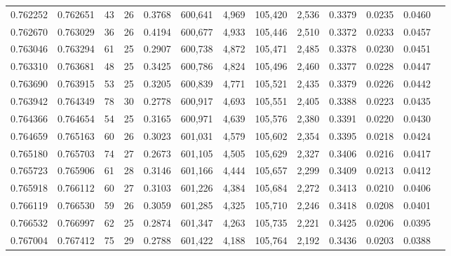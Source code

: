 \begin{tabular}{rrrrrrrrrrrrr}
0.762252 & 0.762651 &  43 &  26 &                                     0.3768 & 600,641 &   4,969 & 105,420 &   2,536 & 0.3379 & 0.0235 & 0.0460 \\
0.762670 & 0.763029 &  36 &  26 &                                     0.4194 & 600,677 &   4,933 & 105,446 &   2,510 & 0.3372 & 0.0233 & 0.0457 \\
0.763046 & 0.763294 &  61 &  25 &                                     0.2907 & 600,738 &   4,872 & 105,471 &   2,485 & 0.3378 & 0.0230 & 0.0451 \\
0.763310 & 0.763681 &  48 &  25 &                                     0.3425 & 600,786 &   4,824 & 105,496 &   2,460 & 0.3377 & 0.0228 & 0.0447 \\
0.763690 & 0.763915 &  53 &  25 &                                     0.3205 & 600,839 &   4,771 & 105,521 &   2,435 & 0.3379 & 0.0226 & 0.0442 \\
0.763942 & 0.764349 &  78 &  30 &                                     0.2778 & 600,917 &   4,693 & 105,551 &   2,405 & 0.3388 & 0.0223 & 0.0435 \\
0.764366 & 0.764654 &  54 &  25 &                                     0.3165 & 600,971 &   4,639 & 105,576 &   2,380 & 0.3391 & 0.0220 & 0.0430 \\
0.764659 & 0.765163 &  60 &  26 &                                     0.3023 & 601,031 &   4,579 & 105,602 &   2,354 & 0.3395 & 0.0218 & 0.0424 \\
0.765180 & 0.765703 &  74 &  27 &                                     0.2673 & 601,105 &   4,505 & 105,629 &   2,327 & 0.3406 & 0.0216 & 0.0417 \\
0.765723 & 0.765906 &  61 &  28 &                                     0.3146 & 601,166 &   4,444 & 105,657 &   2,299 & 0.3409 & 0.0213 & 0.0412 \\
0.765918 & 0.766112 &  60 &  27 &                                     0.3103 & 601,226 &   4,384 & 105,684 &   2,272 & 0.3413 & 0.0210 & 0.0406 \\
0.766119 & 0.766530 &  59 &  26 &                                     0.3059 & 601,285 &   4,325 & 105,710 &   2,246 & 0.3418 & 0.0208 & 0.0401 \\
0.766532 & 0.766997 &  62 &  25 &                                     0.2874 & 601,347 &   4,263 & 105,735 &   2,221 & 0.3425 & 0.0206 & 0.0395 \\
0.767004 & 0.767412 &  75 &  29 &                                     0.2788 & 601,422 &   4,188 & 105,764 &   2,192 & 0.3436 & 0.0203 & 0.0388 \\

\end{tabular}
